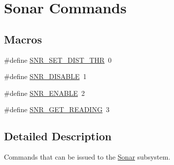 \hypertarget{group__sonar__commands}{\section{Sonar Commands}
\label{group__sonar__commands}
}
\subsection*{Macros}
\begin{DoxyCompactItemize}
\item 
\#define \hyperlink{group__sonar__commands_gaa5d2a4af7281457c965323f4c26ea9ab}{S\-N\-R\-\_\-\-S\-E\-T\-\_\-\-D\-I\-S\-T\-\_\-\-T\-H\-R}~0
\item 
\#define \hyperlink{group__sonar__commands_ga9b110968cd5bd961f4984c02965cf9ba}{S\-N\-R\-\_\-\-D\-I\-S\-A\-B\-L\-E}~1
\item 
\#define \hyperlink{group__sonar__commands_ga994c94413393c44561f42e781da5815f}{S\-N\-R\-\_\-\-E\-N\-A\-B\-L\-E}~2
\item 
\#define \hyperlink{group__sonar__commands_ga6b4b3d5c4969ca317548a1d9c8686c4f}{S\-N\-R\-\_\-\-G\-E\-T\-\_\-\-R\-E\-A\-D\-I\-N\-G}~3
\end{DoxyCompactItemize}


\subsection{Detailed Description}
Commands that can be issued to the \hyperlink{classSonar}{Sonar} subsystem. 

